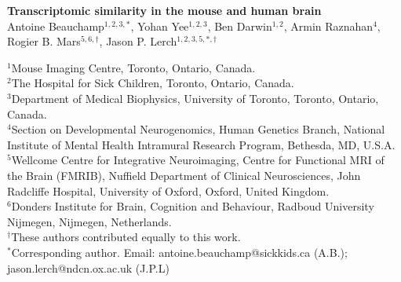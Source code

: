 
\LARGE{\textbf{Transcriptomic similarity in the mouse and human brain}}\\

\large
Antoine Beauchamp$^{1,2,3,*}$, Yohan Yee$^{1,2,3}$, Ben Darwin$^{1,2}$, Armin Raznahan$^{4}$, Rogier B. Mars$^{5,6,\dagger}$, Jason P. Lerch$^{1,2,3,5,*,\dagger}$\\

\onehalfspacing

\small
$^1$Mouse Imaging Centre, Toronto, Ontario, Canada.\\
$^2$The Hospital for Sick Children, Toronto, Ontario, Canada.\\
$^3$Department of Medical Biophysics, University of Toronto, Toronto, Ontario, Canada.\\
$^4$Section on Developmental Neurogenomics, Human Genetics Branch, National Institute of Mental Health Intramural Research Program, Bethesda, MD, U.S.A.\\
$^5$Wellcome Centre for Integrative Neuroimaging, Centre for Functional MRI of the Brain (FMRIB), Nuffield Department of Clinical Neurosciences, John Radcliffe Hospital, University of Oxford, Oxford, United Kingdom.\\
$^6$Donders Institute for Brain, Cognition and Behaviour, Radboud University Nijmegen, Nijmegen, Netherlands.\\
$^{\dagger}$These authors contributed equally to this work.\\
$^{*}$Corresponding author. Email: antoine.beauchamp@sickkids.ca (A.B.); jason.lerch@ndcn.ox.ac.uk (J.P.L)


\normalsize
{}